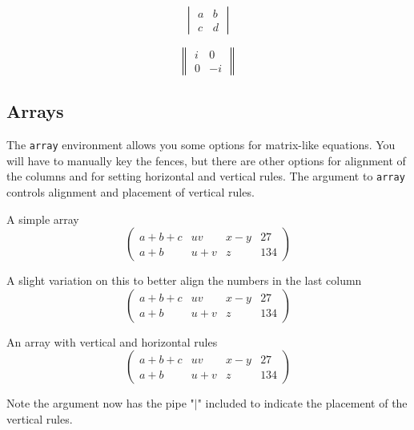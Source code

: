 \documentclass[journal,9pt]{IEEEtran}
\begin{document}
\begin{equation}
  \begin{vmatrix} a & b \\
                c & d\end{vmatrix}
\end{equation}

\begin{equation}
  \begin{Vmatrix} i & 0  \\
                0 & -i\end{Vmatrix}
\end{equation}


\subsection{Arrays}
The {\tt{array}} environment allows you some options for matrix-like equations. You will have to manually key the fences, but there are other options for alignment of the columns and for setting horizontal and vertical rules. The argument to {\tt{array}} controls alignment and placement of vertical rules.

A simple array
\begin{equation}
  \left(
  \begin{array}{cccc}
    a+b+c & uv  & x-y & 27  \\
    a+b   & u+v & z   & 134
  \end{array}\right)
\end{equation}

A slight variation on this to better align the numbers in the last column
\begin{equation}
  \left(
  \begin{array}{cccr}
    a+b+c & uv  & x-y & 27  \\
    a+b   & u+v & z   & 134
  \end{array}\right)
\end{equation}


An array with vertical and horizontal rules
\begin{equation}
  \left( \begin{array}{c|c|c|r}
    a+b+c & uv  & x-y & 27  \\ \hline
    a+b   & u+v & z   & 134
  \end{array}\right)
\end{equation}

Note the argument now has the pipe "$\vert$" included to indicate the placement of the vertical rules.
\end{document}
